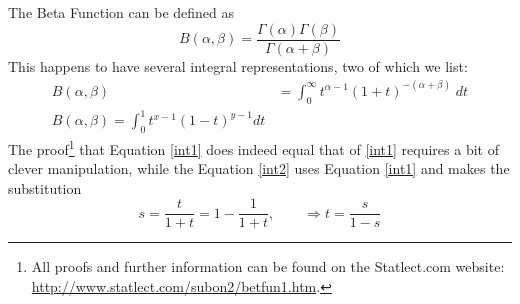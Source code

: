 \documentclass[a4paper,12pt]{scrartcl}
\begin{document}
The Beta Function can be defined as 
\[ B(\alpha, \beta) = \frac{\Gamma(\alpha) \Gamma(\beta)}{\Gamma(\alpha
   + \beta)} \]
This happens to have several integral representations, two of which
we list:
\begin{align}
   B(\alpha, \beta) &= \int^{\infty}_0 t^{\alpha-1} (1+t)^{-(\alpha+
   \beta)} \; dt \label{int1} \\
   B(\alpha, \beta) = \int^1_0 t^{x-1} (1-t)^{y-1} dt \label{int2}
\end{align}
The proof\footnote{All proofs and further information can be found
   on the Statlect.com website: 
   \url{http://www.statlect.com/subon2/betfun1.htm}. }
that Equation \ref{int1} does indeed equal that of \ref{int1}
requires a bit of clever manipulation, while the Equation \ref{int2} uses
Equation \ref{int1} and makes the substitution 
   \[ s = \frac{t}{1+t} = 1-\frac{1}{1+t}, \qquad \Rightarrow
      t = \frac{s}{1-s} \]
\end{document}

